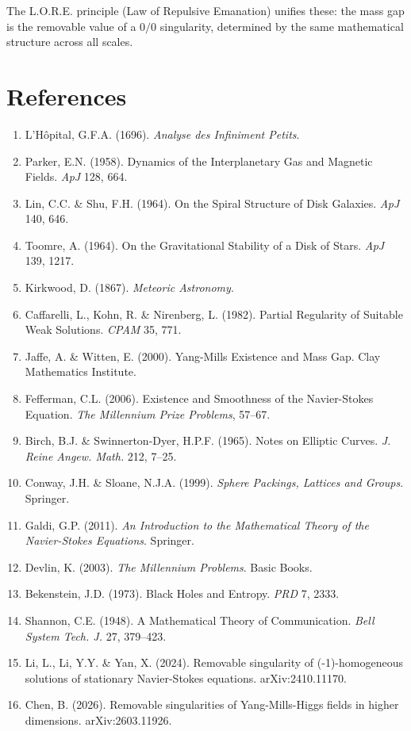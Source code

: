 \documentclass[12pt]{article}
\begin{document}
The L.O.R.E. principle (Law of Repulsive Emanation) unifies these: the mass gap is the removable value of a $0/0$ singularity, determined by the same mathematical structure across all scales.

\section*{References}

\begin{enumerate}
\item L'H\^{o}pital, G.F.A. (1696). \textit{Analyse des Infiniment Petits}.
\item Parker, E.N. (1958). Dynamics of the Interplanetary Gas and Magnetic Fields. \textit{ApJ} 128, 664.
\item Lin, C.C. \& Shu, F.H. (1964). On the Spiral Structure of Disk Galaxies. \textit{ApJ} 140, 646.
\item Toomre, A. (1964). On the Gravitational Stability of a Disk of Stars. \textit{ApJ} 139, 1217.
\item Kirkwood, D. (1867). \textit{Meteoric Astronomy}.
\item Caffarelli, L., Kohn, R. \& Nirenberg, L. (1982). Partial Regularity of Suitable Weak Solutions. \textit{CPAM} 35, 771.
\item Jaffe, A. \& Witten, E. (2000). Yang-Mills Existence and Mass Gap. Clay Mathematics Institute.
\item Fefferman, C.L. (2006). Existence and Smoothness of the Navier-Stokes Equation. \textit{The Millennium Prize Problems}, 57--67.
\item Birch, B.J. \& Swinnerton-Dyer, H.P.F. (1965). Notes on Elliptic Curves. \textit{J. Reine Angew. Math.} 212, 7--25.
\item Conway, J.H. \& Sloane, N.J.A. (1999). \textit{Sphere Packings, Lattices and Groups}. Springer.
\item Galdi, G.P. (2011). \textit{An Introduction to the Mathematical Theory of the Navier-Stokes Equations}. Springer.
\item Devlin, K. (2003). \textit{The Millennium Problems}. Basic Books.
\item Bekenstein, J.D. (1973). Black Holes and Entropy. \textit{PRD} 7, 2333.
\item Shannon, C.E. (1948). A Mathematical Theory of Communication. \textit{Bell System Tech. J.} 27, 379--423.
\item Li, L., Li, Y.Y. \& Yan, X. (2024). Removable singularity of (-1)-homogeneous solutions of stationary Navier-Stokes equations. arXiv:2410.11170.
\item Chen, B. (2026). Removable singularities of Yang-Mills-Higgs fields in higher dimensions. arXiv:2603.11926.
\end{enumerate}
\end{document}
